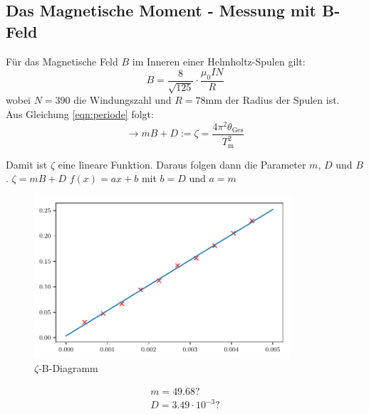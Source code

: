 \subsection{Das Magnetische Moment - Messung mit B-Feld}

Für das Magnetische Feld $B$ im Inneren einer Helmholtz-Spulen gilt:
\begin{equation}
    B= \frac{8}{\sqrt{125}} \cdot \frac{\mu_0 I N}{R}
\end{equation}
wobei $N=390$ die Windungszahl und $R=78$mm der Radius der Spulen ist.\\
Aus Gleichung \ref{eqn:periode}
folgt:
\begin{equation}
    \to mB+D := \zeta = \frac{4\pi^2\theta_\text{Ges}}{T^2_\text{m}}
\end{equation}

Damit ist $\zeta$ eine lineare Funktion. Daraus folgen dann die Parameter $m$, $D$ und $B$.\newline
$\zeta = mB + D$ \to $f(x)=ax+b$ mit $b = D$ und $a=m$

\begin{figure}[h]
    \centering
    \includegraphics[width=0.85\textwidth, height=0.5\textwidth]{build/plot.pdf}
    \caption{$\zeta$-B-Diagramm}        
    \label{fig:Diagramm}
\end{figure}


\begin{gather}
    m = 49.68 \mathrm{ ?}\\
    D = 3.49\cdot10^{-3} \mathrm{ ?}\\
\end{gather}

